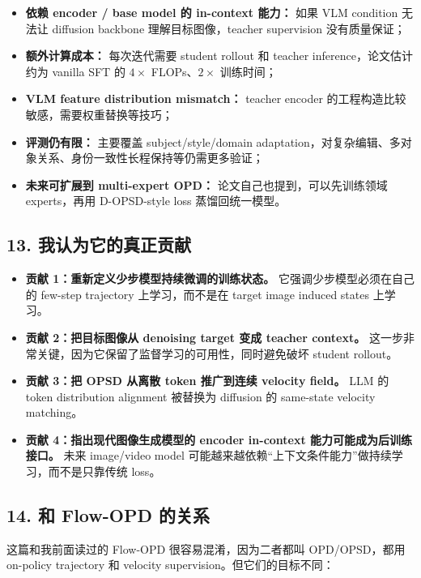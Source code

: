 \begin{itemize}[leftmargin=1.5em]
  \item \textbf{依赖 encoder / base model 的 in-context 能力：} 如果 VLM condition 无法让 diffusion backbone 理解目标图像，teacher supervision 没有质量保证；
  \item \textbf{额外计算成本：} 每次迭代需要 student rollout 和 teacher inference，论文估计约为 vanilla SFT 的 $4\times$ FLOPs、$2\times$ 训练时间；
  \item \textbf{VLM feature distribution mismatch：} teacher encoder 的工程构造比较敏感，需要权重替换等技巧；
  \item \textbf{评测仍有限：} 主要覆盖 subject/style/domain adaptation，对复杂编辑、多对象关系、身份一致性长程保持等仍需更多验证；
  \item \textbf{未来可扩展到 multi-expert OPD：} 论文自己也提到，可以先训练领域 experts，再用 D-OPSD-style loss 蒸馏回统一模型。
\end{itemize}

\subsection{13. 我认为它的真正贡献}

\begin{itemize}[leftmargin=1.5em]
  \item \textbf{贡献 1：重新定义少步模型持续微调的训练状态。} 它强调少步模型必须在自己的 few-step trajectory 上学习，而不是在 target image induced states 上学习。
  \item \textbf{贡献 2：把目标图像从 denoising target 变成 teacher context。} 这一步非常关键，因为它保留了监督学习的可用性，同时避免破坏 student rollout。
  \item \textbf{贡献 3：把 OPSD 从离散 token 推广到连续 velocity field。} LLM 的 token distribution alignment 被替换为 diffusion 的 same-state velocity matching。
  \item \textbf{贡献 4：指出现代图像生成模型的 encoder in-context 能力可能成为后训练接口。} 未来 image/video model 可能越来越依赖“上下文条件能力”做持续学习，而不是只靠传统 loss。
\end{itemize}

\subsection{14. 和 Flow-OPD 的关系}

这篇和我前面读过的 Flow-OPD 很容易混淆，因为二者都叫 OPD/OPSD，都用 on-policy trajectory 和 velocity supervision。但它们的目标不同：

